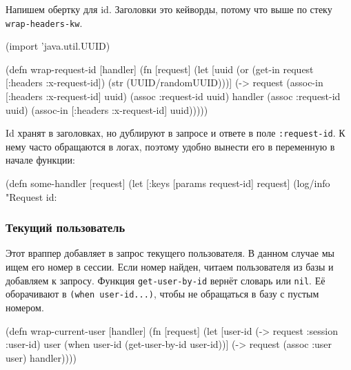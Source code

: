 
Напишем обертку для id. Заголовки это кейворды, потому что выше по стеку
\verb|wrap-headers-kw|.

\begin{english}
  \begin{clojure}
(import 'java.util.UUID)

(defn wrap-request-id [handler]
  (fn [request]
    (let [uuid (or (get-in request [:headers :x-request-id])
                   (str (UUID/randomUUID)))]
      (-> request
          (assoc-in [:headers :x-request-id] uuid)
          (assoc :request-id uuid)
          handler
          (assoc :request-id uuid)
          (assoc-in [:headers :x-request-id] uuid)))))
  \end{clojure}
\end{english}


Id хранят в заголовках, но дублируют в запросе и ответе в поле
\verb|:request-id|. К нему часто обращаются в логах, поэтому удобно вынести
его в переменную в начале функции:


\begin{english}
  \begin{clojure}
(defn some-handler [request]
  (let [{:keys [params request-id]} request]
    (log/info "Request id: %
  \end{clojure}
\end{english}

\subsubsection*{Текущий пользователь}


Этот враппер добавляет в запрос текущего пользователя. В данном случае мы ищем
его номер в сессии. Если номер найден, читаем пользователя из базы и добавляем к
запросу. Функция \verb|get-user-by-id| вернёт словарь или
\verb|nil|. Её оборачивают в \verb|(when user-id...)|, чтобы не
обращаться в базу с пустым номером.


\begin{english}
  \begin{clojure}
(defn wrap-current-user [handler]
  (fn [request]
    (let [user-id (-> request :session :user-id)
          user (when user-id
                 (get-user-by-id user-id))]
      (-> request
          (assoc :user user)
          handler))))
  \end{clojure}
\end{english}

